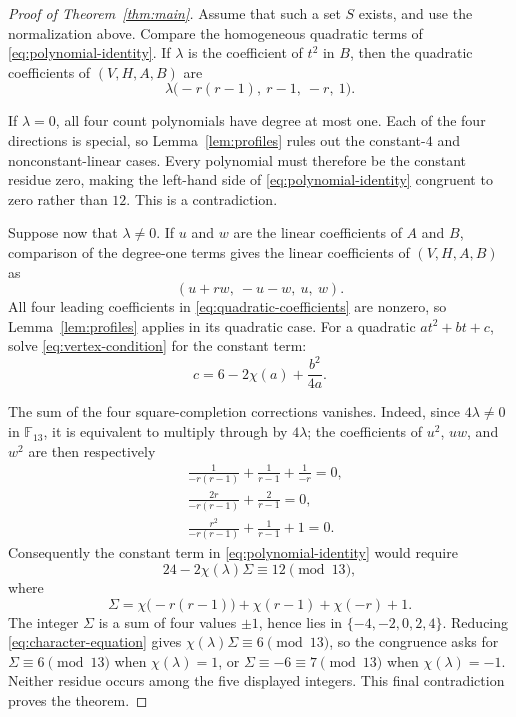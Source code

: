 \documentclass[11pt]{amsart}
\theoremstyle{remark}
\newcommand{\F}{\mathbb F}
\begin{document}
\begin{proof}[Proof of Theorem~\ref{thm:main}]
Assume that such a set $S$ exists, and use the normalization above.  Compare
the homogeneous quadratic terms of \eqref{eq:polynomial-identity}.  If
$\lambda$ is the coefficient of $t^2$ in $B$, then the quadratic coefficients
of $(V,H,A,B)$ are
\begin{equation}\label{eq:quadratic-coefficients}
  \lambda\bigl(-r(r-1),\ r-1,\ -r,\ 1\bigr).
\end{equation}

If $\lambda=0$, all four count polynomials have degree at most one.  Each of
the four directions is special, so Lemma~\ref{lem:profiles} rules out the
constant-$4$ and nonconstant-linear cases.  Every polynomial must therefore
be the constant residue zero, making the left-hand side of
\eqref{eq:polynomial-identity} congruent to zero rather than $12$.  This is a
contradiction.

Suppose now that $\lambda\ne0$.  If $u$ and $w$ are the linear coefficients
of $A$ and $B$, comparison of the degree-one terms gives the linear
coefficients of $(V,H,A,B)$ as
\begin{equation}\label{eq:linear-coefficients}
  (u+rw,\ -u-w,\ u,\ w).
\end{equation}
All four leading coefficients in \eqref{eq:quadratic-coefficients} are
nonzero, so Lemma~\ref{lem:profiles} applies in its quadratic case.  For a
quadratic $at^2+bt+c$, solve \eqref{eq:vertex-condition} for the constant
term:
\[
  c=6-2\chi(a)+\frac{b^2}{4a}.
\]

The sum of the four square-completion corrections vanishes.  Indeed, since
$4\lambda\neq0$ in $\F_{13}$, it is equivalent to multiply through by
$4\lambda$; the coefficients of $u^{2}$, $uw$, and $w^{2}$ are then
respectively
\begin{align*}
 &\frac1{-r(r-1)}+\frac1{r-1}+\frac1{-r}=0,\\
 &\frac{2r}{-r(r-1)}+\frac2{r-1}=0,\\
 &\frac{r^2}{-r(r-1)}+\frac1{r-1}+1=0.
\end{align*}
Consequently the constant term in \eqref{eq:polynomial-identity} would require
\begin{equation}\label{eq:character-equation}
  24-2\chi(\lambda)\Sigma\equiv12\pmod{13},
\end{equation}
where
\[
  \Sigma=
  \chi\bigl(-r(r-1)\bigr)+\chi(r-1)+\chi(-r)+1.
\]
The integer $\Sigma$ is a sum of four values $\pm1$, hence lies in
$\{-4,-2,0,2,4\}$.  Reducing \eqref{eq:character-equation} gives
$\chi(\lambda)\Sigma\equiv6\pmod{13}$, so the congruence asks for
$\Sigma\equiv6\pmod{13}$ when $\chi(\lambda)=1$, or
$\Sigma\equiv-6\equiv7\pmod{13}$ when $\chi(\lambda)=-1$.  Neither residue
occurs among the five displayed integers.  This final contradiction proves
the theorem.
\end{proof}
\end{document}
